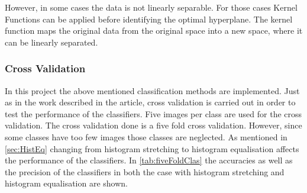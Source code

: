 However, in some cases the data is not linearly separable. For those cases Kernel Functions can be applied before identifying the optimal hyperplane. The kernel function maps the original data from the original space into a new space, where it can be linearly separated.  

\subsubsection*{Cross Validation}
In this project the above mentioned classification methods are implemented. Just as in the work described in the article, cross validation is carried out in order to test the performance of the classifiers. Five images per class are used for the cross validation. The cross validation done is a five fold cross validation. However, since some classes have too few images those classes are neglected. As mentioned in \autoref{sec:HistEq} changing from histogram stretching to histogram equalisation affects the performance of the classifiers. In \autoref{tab:fiveFoldClas} the accuracies as well as the precision of the classifiers in both the case with histogram stretching and histogram equalisation are shown.  

